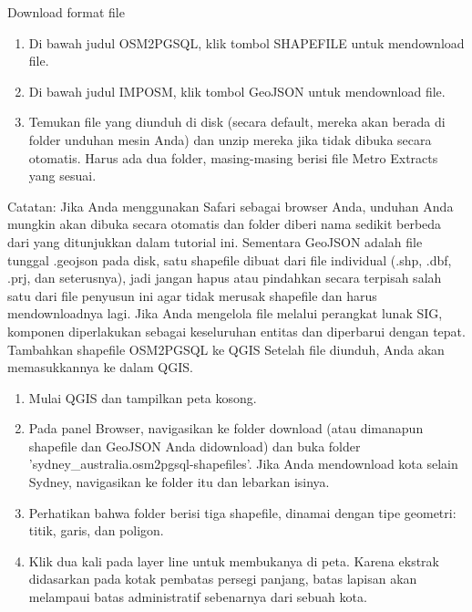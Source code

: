 Download format file

\begin{enumerate}
\item
Di bawah judul OSM2PGSQL, klik tombol SHAPEFILE untuk mendownload file.
\item
Di bawah judul IMPOSM, klik tombol GeoJSON untuk mendownload file.
\item
Temukan file yang diunduh di disk (secara default, mereka akan berada di folder unduhan mesin Anda) dan unzip mereka jika tidak dibuka secara otomatis. Harus ada dua folder, masing-masing berisi file Metro Extracts yang sesuai.
\end{enumerate}
Catatan: Jika Anda menggunakan Safari sebagai browser Anda, unduhan Anda mungkin akan dibuka secara otomatis dan folder diberi nama sedikit berbeda dari yang ditunjukkan dalam tutorial ini.
Sementara GeoJSON adalah file tunggal .geojson pada disk, satu shapefile dibuat dari file individual (.shp, .dbf, .prj, dan seterusnya), jadi jangan hapus atau pindahkan secara terpisah salah satu dari file penyusun ini agar tidak merusak shapefile dan harus mendownloadnya lagi. Jika Anda mengelola file melalui perangkat lunak SIG, komponen diperlakukan sebagai keseluruhan entitas dan diperbarui dengan tepat.
Tambahkan shapefile OSM2PGSQL ke QGIS
Setelah file diunduh, Anda akan memasukkannya ke dalam QGIS.
\begin{enumerate}
\item
Mulai QGIS dan tampilkan peta kosong.
\item
Pada panel Browser, navigasikan ke folder download (atau dimanapun shapefile dan GeoJSON Anda didownload) dan buka folder 'sydney_australia.osm2pgsql-shapefiles'. Jika Anda mendownload kota selain Sydney, navigasikan ke folder itu dan lebarkan isinya.
\item
Perhatikan bahwa folder berisi tiga shapefile, dinamai dengan tipe geometri: titik, garis, dan poligon.
\item
Klik dua kali pada layer line untuk membukanya di peta. Karena ekstrak didasarkan pada kotak pembatas persegi panjang, batas lapisan akan melampaui batas administratif sebenarnya dari sebuah kota.
\end{enumerate}

